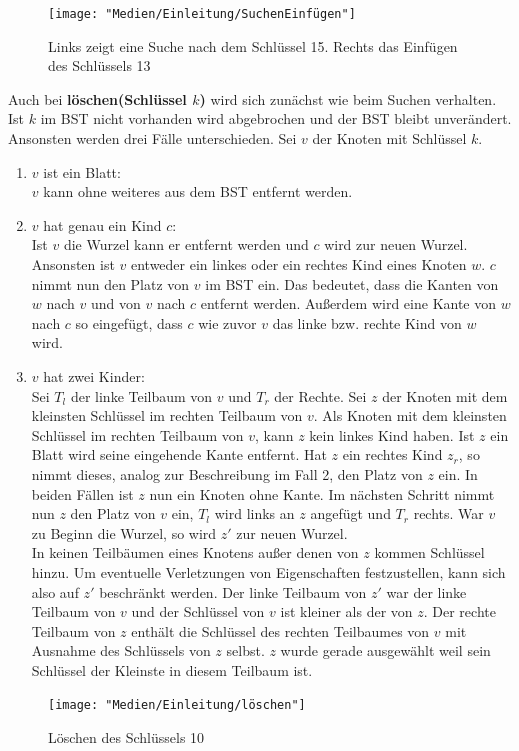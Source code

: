 \documentclass[a4paper,12pt]{article}
\begin{document}
\begin{figure}[h]
	\centering
	\texttt{[image: "Medien/Einleitung/SuchenEinfügen"]}
	\caption{Links zeigt eine Suche nach dem Schlüssel 15. Rechts das Einfügen des Schlüssels 13}
	\label{fig:SuchenEinfügen}
\end{figure}
\noindent Auch bei \textbf{löschen(Schlüssel $k$)} wird sich zunächst wie beim Suchen verhalten. Ist $k$ im BST nicht vorhanden wird abgebrochen und der BST bleibt unverändert. Ansonsten werden drei Fälle unterschieden.
Sei $v$ der Knoten mit Schlüssel $k$.
\begin{enumerate}
	\item $v$ ist ein Blatt: \\
	$v$ kann ohne weiteres aus dem BST entfernt werden.
	\item $v$ hat genau ein Kind $c$:\\
     Ist $v$ die Wurzel kann er entfernt werden und $c$ wird zur neuen Wurzel. Ansonsten ist $v$ entweder ein linkes oder ein rechtes Kind eines Knoten $w$. $c$ nimmt nun den Platz von $v$ im BST ein. Das bedeutet, dass die Kanten von $w$ nach $v$ und von $v$ nach $c$ entfernt werden. Außerdem wird eine Kante von $w$ nach $c$ so eingefügt, dass $c$ wie zuvor $v$ das linke bzw. rechte Kind von $w$ wird. 
	\item $v$ hat zwei Kinder:\\
	Sei $T_l$ der linke Teilbaum von $v$ und $T_r$ der Rechte.
	Sei $z$ der Knoten mit dem kleinsten Schlüssel im rechten Teilbaum von $v$. Als Knoten mit dem kleinsten Schlüssel im rechten Teilbaum von $v$, kann $z$ kein linkes Kind haben. Ist $z$ ein Blatt wird seine eingehende Kante entfernt. Hat $z$ ein rechtes Kind $z_r$, so nimmt dieses, analog zur Beschreibung im Fall 2, den Platz von $z$ ein. In beiden Fällen ist $z$ nun ein Knoten ohne Kante. Im nächsten Schritt nimmt nun $z$ den Platz von $v$ ein, $T_l$ wird links an $z$ angefügt und $T_r$ rechts. War $v$ zu Beginn die Wurzel, so wird $z'$ zur neuen Wurzel.\\
	In keinen Teilbäumen eines Knotens außer denen von $z$ kommen Schlüssel hinzu. Um eventuelle Verletzungen von Eigenschaften festzustellen, kann sich also auf $z'$ beschränkt werden. Der linke Teilbaum von $z'$ war der linke Teilbaum von $v$ und der Schlüssel von $v$ ist kleiner als der von $z$. Der rechte Teilbaum von $z$ enthält die Schlüssel des rechten Teilbaumes von $v$ mit Ausnahme des Schlüssels von $z$ selbst. $z$ wurde gerade ausgewählt weil sein Schlüssel der Kleinste in diesem Teilbaum ist. 
	
	
	
	 
\end{enumerate} 
\begin{figure}[h]
	\centering
	\texttt{[image: "Medien/Einleitung/löschen"]}
	\caption{Löschen des Schlüssels 10}
	\label{fig:löschen}
\end{figure}
\end{document}
